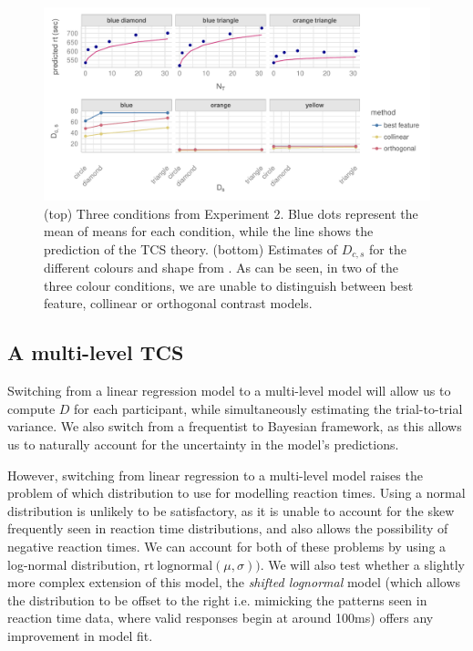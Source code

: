 \documentclass[smallextended, natbib]{svjour3}       %
\begin{document}
\begin{figure}
\centering
\includegraphics[width=\textwidth]{../plots/computational_replication_issues.pdf}
\caption{(top) Three conditions from Experiment 2. Blue dots represent the mean of means for each condition, while the line shows the prediction of the TCS theory. (bottom) Estimates of $D_{c,s}$ for the different colours and shape from \cite{buetti2019predicting}. As can be seen, in two of the three colour conditions, we are unable to distinguish between best feature, collinear or orthogonal contrast models.}
\label{fig:comp_rep_conditions}
\end{figure}

\subsection{A multi-level TCS}
\label{sec:reanalysis}

Switching from a linear regression model to a multi-level model will allow us to compute $D$ for each participant, while simultaneously estimating the trial-to-trial variance. We also switch from a frequentist to Bayesian framework, as this allows us to naturally account for the uncertainty in the model's predictions.

However, switching from linear regression to a multi-level model raises the problem of which distribution to use for modelling reaction times. Using a normal distribution is unlikely to be satisfactory, as it is unable to account for the skew frequently seen in reaction time distributions, and also allows the possibility of negative reaction times. We can account for both of these problems by using a log-normal distribution, $\text{rt} ~ \text{lognormal}(\mu, \sigma))$. We will also test whether a slightly more complex extension of this model, the \textit{shifted lognormal} model (which allows the distribution to be offset to the right i.e. mimicking the patterns seen in reaction time data, where valid responses begin at around 100ms) offers any improvement in model fit.
\end{document}
